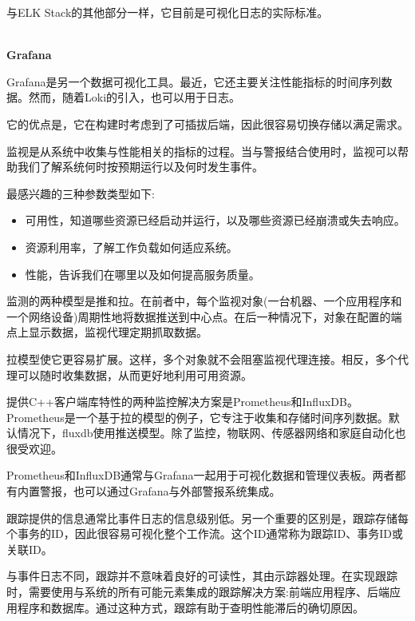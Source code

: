 与ELK Stack的其他部分一样，它目前是可视化日志的实际标准。

\hspace*{\fill} \\ %
\noindent
\textbf{Grafana}

Grafana是另一个数据可视化工具。最近，它还主要关注性能指标的时间序列数据。然而，随着Loki的引入，也可以用于日志。

它的优点是，它在构建时考虑到了可插拔后端，因此很容易切换存储以满足需求。


监视是从系统中收集与性能相关的指标的过程。当与警报结合使用时，监视可以帮助我们了解系统何时按预期运行以及何时发生事件。

最感兴趣的三种参数类型如下:

\begin{itemize}
\item 
可用性，知道哪些资源已经启动并运行，以及哪些资源已经崩溃或失去响应。

\item 
资源利用率，了解工作负载如何适应系统。

\item 
性能，告诉我们在哪里以及如何提高服务质量。
\end{itemize}

监测的两种模型是推和拉。在前者中，每个监视对象(一台机器、一个应用程序和一个网络设备)周期性地将数据推送到中心点。在后一种情况下，对象在配置的端点上显示数据，监视代理定期抓取数据。

拉模型使它更容易扩展。这样，多个对象就不会阻塞监视代理连接。相反，多个代理可以随时收集数据，从而更好地利用可用资源。

提供C++客户端库特性的两种监控解决方案是Prometheus和InfluxDB。Prometheus是一个基于拉的模型的例子，它专注于收集和存储时间序列数据。默认情况下，fluxdb使用推送模型。除了监控，物联网、传感器网络和家庭自动化也很受欢迎。

Prometheus和InfluxDB通常与Grafana一起用于可视化数据和管理仪表板。两者都有内置警报，也可以通过Grafana与外部警报系统集成。


跟踪提供的信息通常比事件日志的信息级别低。另一个重要的区别是，跟踪存储每个事务的ID，因此很容易可视化整个工作流。这个ID通常称为跟踪ID、事务ID或关联ID。

与事件日志不同，跟踪并不意味着良好的可读性，其由示踪器处理。在实现跟踪时，需要使用与系统的所有可能元素集成的跟踪解决方案:前端应用程序、后端应用程序和数据库。通过这种方式，跟踪有助于查明性能滞后的确切原因。

